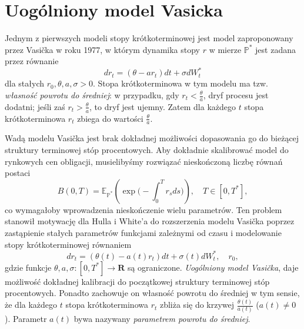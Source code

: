 \documentclass{mini}
\theoremstyle{mythstyle}
\begin{document}
	\section{Uogólniony model Vasicka}
	Jednym z pierwszych modeli stopy krótkoterminowej jest model zaproponowany przez Vasi\v{c}ka w roku 1977, w którym dynamika stopy $r$ w mierze $\mathbb{P}^*$ jest zadana przez równanie
	\begin{equation}
	 dr_t =(\theta -ar_t)dt+\sigma dW_t^*
	\end{equation}
	dla stałych $r_0,\theta,a,\sigma >0$. Stopa krótkoterminowa w tym modelu ma tzw. \textit{własność powrotu do średniej}: w przypadku, gdy $r_t < \frac{\theta}{a}$, dryf procesu jest dodatni; jeśli zaś $r_t > \frac{\theta}{a}$, to dryf jest ujemny. Zatem dla każdego $t$ stopa krótkoterminowa $r_t$ zbiega do wartości $\frac{\theta}{a}$. 
	
	Wadą modelu Vasi\v{c}ka jest brak dokładnej możliwości dopasowania go do bieżącej struktury terminowej stóp procentowych. Aby dokładnie skalibrować model do rynkowych cen obligacji, musielibyśmy rozwiązać nieskończoną liczbę równań postaci
	\begin{equation}
	B(0,T) = \mathbb{E}_{\mathbb{P}^*}
	\left(\exp\bigg(-\int_0^T r_sds\bigg)\right), \quad T \in [0,T^*], 
	\end{equation}
	co wymagałoby wprowadzenia nieskończenie wielu parametrów. Ten problem stanowił motywację dla Hulla i White'a do rozszerzenia modelu Vasi\v{c}ka poprzez zastąpienie stałych parametrów funkcjami zależnymi od czasu i modelowanie stopy krótkoterminowej równaniem
	\begin{equation}
	dr_t =(\theta(t) -a(t)r_t)dt+\sigma(t) dW_t^*, \quad r_0,
	\end{equation}
	gdzie funkcje $\theta,a,\sigma: [0,T^*] \to \mathbf{R}$ są ograniczone. \textit{Uogólniony model Vasi\v{c}ka}, daje możliwość dokładnej kalibracji do początkowej struktury terminowej stóp procentowych. Ponadto zachowuje on własność powrotu do średniej w tym sensie, że dla każdego $t$ stopa krótkoterminowa $r_t$ zbliża się do krzywej $\frac{\theta(t)}{a(t)}$ ($a(t) \neq 0$). Parametr $a(t)$ bywa nazywany \textit{parametrem powrotu do średniej}.
\end{document}

